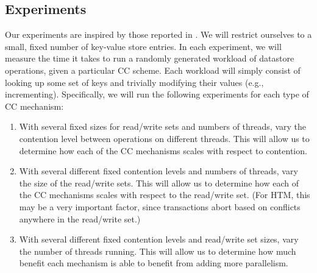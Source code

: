 \subsection{Experiments}
Our experiments are inspired by those reported in \citep{tran2010}. We will restrict ourselves to a small, fixed number of key-value store entries. In each experiment, we will measure the time it takes to run a randomly generated workload of datastore operations, given a particular CC scheme. Each workload will simply consist of looking up some set of keys and trivially modifying their values (e.g., incrementing). Specifically, we will run the following experiments for each type of CC mechanism:
\begin{enumerate}
\item With several fixed sizes for read/write sets and numbers of threads, vary the contention level between operations on different threads. This will allow us to determine how each of the CC mechanisms scales with respect to contention.
\item With several different fixed contention levels and numbers of threads, vary the size of the read/write sets. This will allow us to determine how each of the CC mechanisms scales with respect to the read/write set. (For HTM, this may be a very important factor, since transactions abort based on conflicts anywhere in the read/write set.)
\item With several different fixed contention levels and read/write set sizes, vary the number of threads running. This will allow us to determine how much benefit each mechanism is able to benefit from adding more parallelism.
\end{enumerate}

